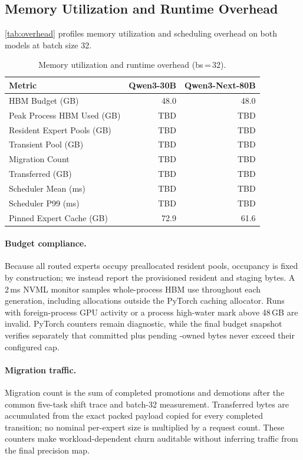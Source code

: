 \subsection{Memory Utilization and Runtime Overhead}
\label{sec:eval-overhead}

\autoref{tab:overhead} profiles memory utilization and scheduling overhead on both models at batch size 32.

\begin{table}[t]
\centering
\caption{Memory utilization and runtime overhead (bs\,=\,32).}
\label{tab:overhead}
\vspace{-0.5em}
\setlength{\tabcolsep}{4pt}
\begin{tabular}{lrr}
\toprule
\textbf{Metric} & \textbf{Qwen3-30B} & \textbf{Qwen3-Next-80B} \\
\midrule
HBM Budget (GB)              & 48.0  & 48.0  \\
Peak Process HBM Used (GB)   & TBD & TBD \\
Resident Expert Pools (GB)   & TBD & TBD \\
Transient Pool (GB)          & TBD & TBD \\
Migration Count              & TBD & TBD \\
Transferred (GB)             & TBD & TBD \\
Scheduler Mean (ms)          & TBD & TBD \\
Scheduler P99 (ms)           & TBD & TBD \\
Pinned Expert Cache (GB)     & 72.9 & 61.6 \\
\bottomrule
\end{tabular}
\end{table}

\paragraph{Budget compliance.}
Because all routed experts occupy preallocated resident pools, occupancy is fixed by construction; we instead report the provisioned resident and staging bytes. A 2\,ms NVML monitor samples whole-process HBM use throughout each generation, including allocations outside the PyTorch caching allocator. Runs with foreign-process GPU activity or a process high-water mark above 48\,GB are invalid. PyTorch counters remain diagnostic, while the final budget snapshot verifies separately that committed plus pending \systemname-owned bytes never exceed their configured cap.

\paragraph{Migration traffic.}
Migration count is the sum of completed promotions and demotions after the common five-task shift trace and batch-32 measurement. Transferred bytes are accumulated from the exact packed payload copied for every completed transition; no nominal per-expert size is multiplied by a request count. These counters make workload-dependent churn auditable without inferring traffic from the final precision map.

